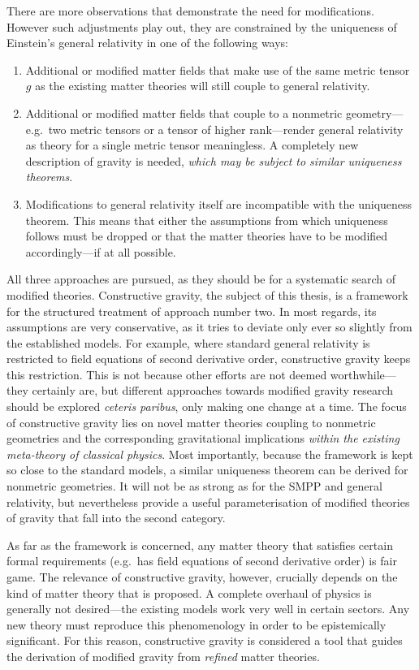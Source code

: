 There are more observations \cite{} that demonstrate the need for modifications. However such adjustments play out, they are constrained by the uniqueness of Einstein's general relativity in one of the following ways:
\begin{enumerate}
  \item Additional or modified matter fields that make use of the same metric tensor $g$ as the existing matter theories will still couple to general relativity.
  \item Additional or modified matter fields that couple to a nonmetric geometry---e.g.\ two metric tensors or a tensor of higher rank---render general relativity as theory for a single metric tensor meaningless. A completely new description of gravity is needed, \emph{which may be subject to similar uniqueness theorems}.
  \item Modifications to general relativity itself are incompatible with the uniqueness theorem. This means that either the assumptions from which uniqueness follows must be dropped or that the matter theories have to be modified accordingly---if at all possible.
\end{enumerate}
All three approaches are pursued, as they should be for a systematic search of modified theories. Constructive gravity, the subject of this thesis, is a framework for the structured treatment of approach number two. In most regards, its assumptions are very conservative, as it tries to deviate only ever so slightly from the established models. For example, where standard general relativity is restricted to field equations of second derivative order, constructive gravity keeps this restriction. This is not because other efforts are not deemed worthwhile---they certainly are, but different approaches towards modified gravity research should be explored \emph{ceteris paribus}, only making one change at a time. The focus of constructive gravity lies on novel matter theories coupling to nonmetric geometries and the corresponding gravitational implications \emph{within the existing meta-theory of classical physics}. Most importantly, because the framework is kept so close to the standard models, a similar uniqueness theorem can be derived for nonmetric geometries. It will not be as strong as for the SMPP and general relativity, but nevertheless provide a useful parameterisation of modified theories of gravity that fall into the second category.

As far as the framework is concerned, any matter theory that satisfies certain formal requirements (e.g.\ has field equations of second derivative order) is fair game. The relevance of constructive gravity, however, crucially depends on the kind of matter theory that is proposed. A complete overhaul of physics is generally not desired---the existing models work very well in certain sectors. Any new theory must reproduce this phenomenology in order to be epistemically significant. For this reason, constructive gravity is considered a tool that guides the derivation of modified gravity from \emph{refined} matter theories.

